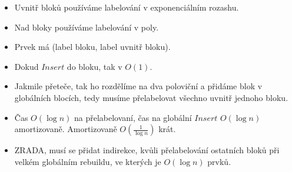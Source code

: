 \documentclass[11pt,a4paper]{article}
\begin{document}
\begin{itemize}
\begin{itemize}
        \item Uvnitř bloků používáme labelování v exponenciálním rozashu.
        \item Nad bloky používáme labelování v poly.
        \item Prvek má (label bloku, label uvnitř bloku).
        \item Dokud $Insert$ do bloku, tak v $O(1)$.
        \item Jakmile přeteče, tak ho rozdělíme na dva poloviční a přidáme blok v globálních blocích, tedy musíme přelabelovat všechno uvnitř jednoho bloku.
        \item Čas $O(\log n)$ na přelabelovaní, čas na globální $Insert$ $O(\log n)$ amortizovaně. Amortizovaně $O(\frac{1}{\log n})$ krát.
        \item ZRADA, musí se přidat indirekce, kvůli přelabelování ostatních bloků při velkém globálním rebuildu, ve kterých je $O(\log n)$ prvků.  
    \end{itemize}
\end{itemize}
\end{document}
